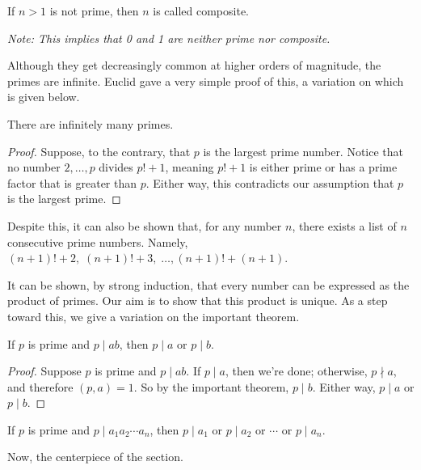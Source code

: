 \documentclass[../m055main.tex]{subfiles}
\begin{document}
\begin{definition}
    If $n > 1$ is not prime, then $n$ is called composite.

    \medskip
    \textit{Note: This implies that 0 and 1 are neither prime nor composite.}
\end{definition}

Although they get decreasingly common at higher orders of magnitude, the primes are infinite.
Euclid gave a very simple proof of this, a variation on which is given below.

\begin{theorem}
    There are infinitely many primes.
\end{theorem}

\begin{proof}
    Suppose, to the contrary, that $p$ is the largest prime number.
    Notice that no number $2, \ldots, p$ divides $p! + 1$, meaning $p! + 1$ is either prime or has a prime factor that is greater than $p$.
    Either way, this contradicts our assumption that $p$ is the largest prime.
\end{proof}

Despite this, it can also be shown that, for any number $n$, there exists a list of $n$ consecutive prime numbers.
Namely, $(n+1)! + 2, \; (n+1)! + 3, \; \ldots, (n+1)! + (n+1)$.

It can be shown, by strong induction, that every number can be expressed as the product of primes.
Our aim is to show that this product is unique.
As a step toward this, we give a variation on the important theorem.

\begin{theorem}
    If $p$ is prime and $p \mid ab$, then $p \mid a$ or $p \mid b$.
\end{theorem}

\begin{proof}
    Suppose $p$ is prime and $p \mid ab$.
    If $p \mid a$, then we're done; otherwise, $p \nmid a$, and therefore $(p,a) = 1$.
    So by the important theorem, $p \mid b$.
    Either way, $p \mid a$ or $p \mid b$.
\end{proof}

\begin{corollary}
    If $p$ is prime and $p \mid a_1 a_2 \cdots a_n$, then $p \mid a_1$ or $p \mid a_2$ or $\cdots$ or $p \mid a_n$.
\end{corollary}

Now, the centerpiece of the section.
\end{document}
